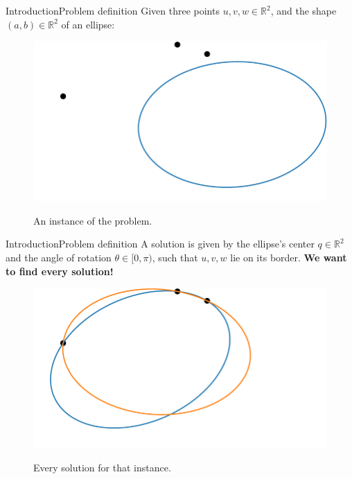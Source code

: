 \documentclass{beamer}
\newcommand{\R}{\mathbb{R}}
\begin{document}
\begin{frame}{Introduction}{Problem definition}
Given three points $u, v, w \in \R^2$, and the shape $(a,b) \in \R^2$ of an ellipse:
	\begin{figure}
	\centering
	
	\includegraphics[scale=.5]{e3psol1.pdf}
	\label{fig:e3psol1}
	\caption{An instance of the problem.}
\end{figure}
\end{frame}

\begin{frame}{Introduction}{Problem definition}
	A solution is given by the ellipse's center $q \in \R^2$ and the angle of rotation $\theta \in [0, \pi)$, such that $u, v, w$ lie on its border. \textbf{We want to find every solution!}
	\begin{figure}
		\centering
		
		\includegraphics[scale=.5]{e3psol2.pdf}
		\label{fig:e3psol2}
		\caption{Every solution for that instance.}
	\end{figure}
\end{frame}
\end{document}
